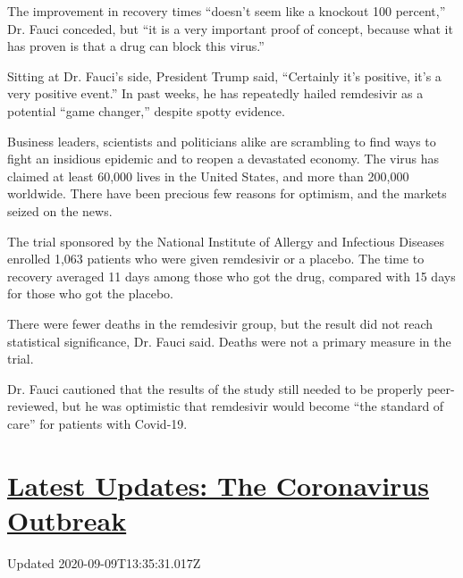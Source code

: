 The improvement in recovery times ``doesn't seem like a knockout 100
percent,'' Dr. Fauci conceded, but ``it is a very important proof of
concept, because what it has proven is that a drug can block this
virus.''

Sitting at Dr. Fauci's side, President Trump said, ``Certainly it's
positive, it's a very positive event.'' In past weeks, he has repeatedly
hailed remdesivir as a potential ``game changer,'' despite spotty
evidence.

Business leaders, scientists and politicians alike are scrambling to
find ways to fight an insidious epidemic and to reopen a devastated
economy. The virus has claimed at least 60,000 lives in the United
States, and more than 200,000 worldwide. There have been precious few
reasons for optimism, and the markets seized on the news.

The trial sponsored by the National Institute of Allergy and Infectious
Diseases enrolled 1,063 patients who were given remdesivir or a placebo.
The time to recovery averaged 11 days among those who got the drug,
compared with 15 days for those who got the placebo.

There were fewer deaths in the remdesivir group, but the result did not
reach statistical significance, Dr. Fauci said. Deaths were not a
primary measure in the trial.

Dr. Fauci cautioned that the results of the study still needed to be
properly peer-reviewed, but he was optimistic that remdesivir would
become ``the standard of care'' for patients with Covid-19.

\hypertarget{latest-updates-the-coronavirus-outbreak}{%
\section{\texorpdfstring{\href{https://www.nytimes3xbfgragh.onion/2020/09/09/world/covid-19-coronavirus.html?action=click\&pgtype=Article\&state=default\&region=MAIN_CONTENT_1\&context=storylines_live_updates}{Latest
Updates: The Coronavirus
Outbreak}}{Latest Updates: The Coronavirus Outbreak}}\label{latest-updates-the-coronavirus-outbreak}}

Updated 2020-09-09T13:35:31.017Z

